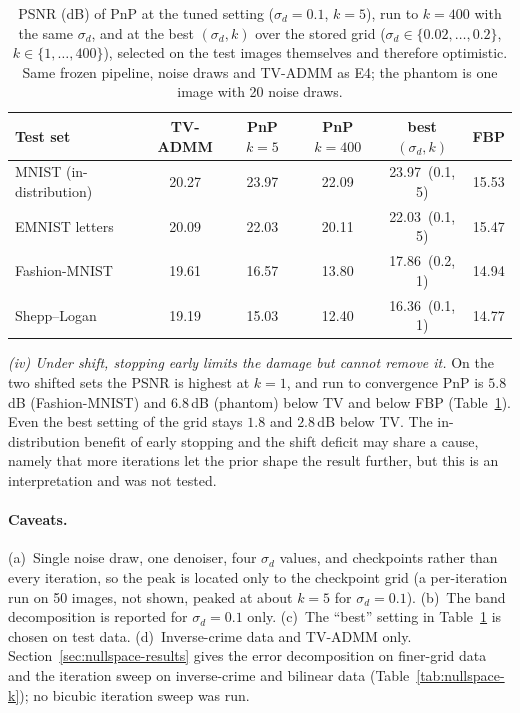 \begin{table}[htbp]
\centering\small\setlength{\tabcolsep}{4pt}
\caption{PSNR (dB) of PnP at the tuned setting ($\sigma_d=0.1$, $k=5$), run to $k=400$ with the same $\sigma_d$, and at the best $(\sigma_d,k)$ over the stored grid ($\sigma_d\in\{0.02,\dots,0.2\}$, $k\in\{1,\dots,400\}$), selected on the test images themselves and therefore optimistic. Same frozen pipeline, noise draws and TV-ADMM as E4; the phantom is one image with 20 noise draws.}\label{tab:e5}
\begin{tabular}{lccccc}
\toprule
Test set & TV-ADMM & PnP $k=5$ & PnP $k=400$ & best $(\sigma_d,k)$ & FBP \\
\midrule
MNIST (in-distribution) & 20.27 & 23.97 & 22.09 & 23.97 \,(0.1, 5) & 15.53 \\
EMNIST letters          & 20.09 & 22.03 & 20.11 & 22.03 \,(0.1, 5) & 15.47 \\
Fashion-MNIST           & 19.61 & 16.57 & 13.80 & 17.86 \,(0.2, 1) & 14.94 \\
Shepp--Logan            & 19.19 & 15.03 & 12.40 & 16.36 \,(0.1, 1) & 14.77 \\
\bottomrule
\end{tabular}
\end{table}

\emph{(iv) Under shift, stopping early limits the damage but cannot remove it.} On the two shifted sets the PSNR is highest at $k=1$, and run to convergence PnP is $5.8$\,dB (Fashion-MNIST) and $6.8$\,dB (phantom) below TV and below FBP (Table~\ref{tab:e5}). Even the best setting of the grid stays $1.8$ and $2.8$\,dB below TV.
The in-distribution benefit of early stopping and the shift deficit may share a cause, namely that more iterations let the prior shape the result further, but this is an interpretation and was not tested.

\paragraph{Caveats.}
(a)~Single noise draw, one denoiser, four $\sigma_d$ values, and checkpoints rather than every iteration, so the peak is located only to the checkpoint grid (a per-iteration run on 50 images, not shown, peaked at about $k=5$ for $\sigma_d=0.1$). (b)~The band decomposition is reported for $\sigma_d=0.1$ only. (c)~The ``best'' setting in Table~\ref{tab:e5} is chosen on test data.
(d)~Inverse-crime data and TV-ADMM only. Section~\ref{sec:nullspace-results} gives the error decomposition on finer-grid data and the iteration sweep on inverse-crime and bilinear data (Table~\ref{tab:nullspace-k}); no bicubic iteration sweep was run.


